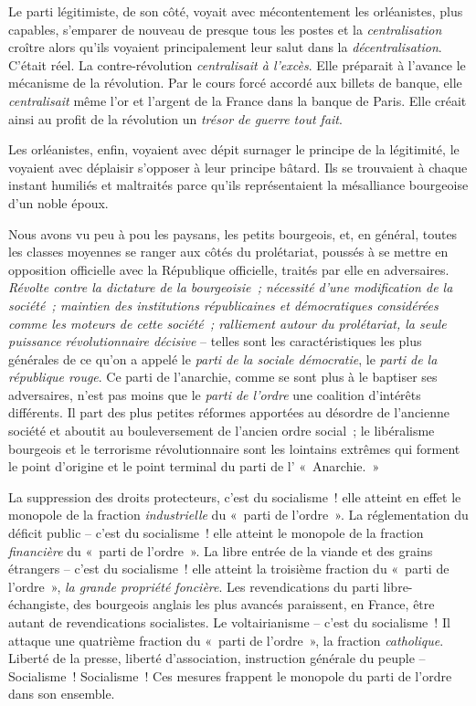\documentclass[french,twoside]{book} %
\begin{document}
Le parti légitimiste, de son côté, voyait avec mécontentement les orléanistes, plus capables, s’emparer de nouveau de presque tous les postes et la \emph{centralisation} croître alors qu’ils voyaient principalement leur salut dans la \emph{décentralisation}. C’était réel. La contre-révolution \emph{centralisait à l’excès}. Elle préparait à l’avance le mécanisme de la révolution. Par le cours forcé accordé aux billets de banque, elle \emph{centralisait} même l’or et l’argent de la France dans la banque de Paris. Elle créait ainsi au profit de la révolution un \emph{trésor de guerre tout fait}.\par
Les orléanistes, enfin, voyaient avec dépit surnager le principe de la légitimité, le voyaient avec déplaisir s’opposer à leur principe bâtard. Ils se trouvaient à chaque instant humiliés et maltraités parce qu’ils représentaient la mésalliance bourgeoise d’un noble époux.\par
Nous avons vu peu à pou les paysans, les petits bourgeois, et, en général, toutes les classes moyennes se ranger aux côtés du prolétariat, poussés à se mettre en opposition officielle avec la République officielle, traités par elle en adversaires. \emph{Révolte contre la dictature de la bourgeoisie ; nécessité d’une modification de la société ; maintien des institutions républicaines et démocratiques considérées comme les moteurs de cette société ; ralliement autour du prolétariat, la seule puissance révolutionnaire décisive} – telles sont les caractéristiques les plus générales de ce qu’on a appelé le \emph{parti de la sociale démocratie}, le \emph{parti de la république rouge}. Ce parti de l’anarchie, comme se sont plus à le baptiser ses adversaires, n’est pas moins que le \emph{parti de l’ordre} une coalition d’intérêts différents. Il part des plus petites réformes apportées au désordre de l’ancienne société et aboutit au bouleversement de l’ancien ordre social ; le libéralisme bourgeois et le terrorisme révolutionnaire sont les lointains extrêmes qui forment le point d’origine et le point terminal du parti de l’ « Anarchie. »\par
La suppression des droits protecteurs, c’est du socialisme ! elle atteint en effet le monopole de la fraction \emph{industrielle} du « parti de l’ordre ». La réglementation du déficit public – c’est du socialisme ! elle atteint le monopole de la fraction \emph{financière} du « parti de l’ordre ». La libre entrée de la viande et des grains étrangers – c’est du socialisme ! elle atteint la troisième fraction du « parti de l’ordre », \emph{la grande propriété foncière}. Les revendications du parti libre-échangiste, des bourgeois anglais les plus avancés paraissent, en France, être autant de revendications socialistes. Le voltairianisme – c’est du socialisme ! Il attaque une quatrième fraction du « parti de l’ordre », la fraction \emph{catholique}. Liberté de la presse, liberté d’association, instruction générale du peuple – Socialisme ! Socialisme ! Ces mesures frappent le monopole du parti de l’ordre dans son ensemble.\par
\end{document}

